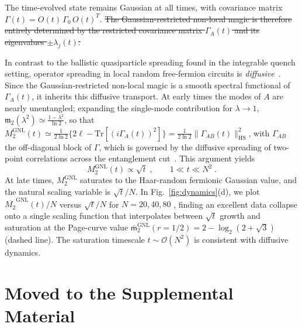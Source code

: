 \documentclass[aps,prl,twocolumn,superscriptaddress,reprint,longbibliography,nofootinbib]{revtex4-2}
\renewcommand{\log}{\operatorname{log}}\renewcommand{\det}{\operatorname{det}}
\providecommand{\DIFaddtex}[1]{{\protect\color{blue}\uwave{#1}}} %
\providecommand{\DIFdeltex}[1]{{\protect\color{red}\sout{#1}}}                      %
\providecommand{\DIFaddbegin}{} %
\providecommand{\DIFaddend}{} %
\providecommand{\DIFdelbegin}{} %
\providecommand{\DIFdelend}{} %
\providecommand{\DIFadd}[1]{\texorpdfstring{\DIFaddtex{#1}}{#1}} %
\providecommand{\DIFdel}[1]{\texorpdfstring{\DIFdeltex{#1}}{}} %
\newcommand{\DIFscaledelfig}{0.5}
\newlength{\DIFdelgraphicswidth} %
\newlength{\DIFdelgraphicsheight} %
\newcommand{\DIFaddincludegraphics}[2][]{{\color{blue}\fbox{\DIFOincludegraphics[#1]{#2}}}} %
\newcommand{\DIFdelincludegraphics}[2][]{%
\sbox{\DIFdelgraphicsbox}{\DIFOincludegraphics[#1]{#2}}%
\settoboxwidth{\DIFdelgraphicswidth}{\DIFdelgraphicsbox} %
\settoboxtotalheight{\DIFdelgraphicsheight}{\DIFdelgraphicsbox} %
\scalebox{\DIFscaledelfig}{%
\parbox[b]{\DIFdelgraphicswidth}{\usebox{\DIFdelgraphicsbox}\\[-\baselineskip] \rule{\DIFdelgraphicswidth}{0em}}\llap{\resizebox{\DIFdelgraphicswidth}{\DIFdelgraphicsheight}{%
\setlength{\unitlength}{\DIFdelgraphicswidth}%
\begin{picture}(1,1)%
\thicklines\linethickness{2pt} %
{\color[rgb]{1,0,0}\put(0,0){\framebox(1,1){}}}%
{\color[rgb]{1,0,0}\put(0,0){\line( 1,1){1}}}%
{\color[rgb]{1,0,0}\put(0,1){\line(1,-1){1}}}%
\end{picture}%
}\hspace*{3pt}}} %
} %
\DeclareRobustCommand{\DIFaddbegin}{\DIFOaddbegin \let\includegraphics\DIFaddincludegraphics} %
\DeclareRobustCommand{\DIFaddend}{\DIFOaddend \let\includegraphics\DIFOincludegraphics} %
\DeclareRobustCommand{\DIFdelbegin}{\DIFOdelbegin \let\includegraphics\DIFdelincludegraphics} %
\DeclareRobustCommand{\DIFdelend}{\DIFOaddend \let\includegraphics\DIFOincludegraphics} %
\begin{document}
\DIFdelend The time-evolved state remains Gaussian at all times, with covariance matrix $\Gamma(t) = O(t)\,\Gamma_0\,O(t)^T$.
\DIFdelbegin \DIFdel{The Gaussian-restricted non-local magic is therefore entirely determined by the restricted covariance matrix $\Gamma_A(t)$ and its eigenvalues $\pm\lambda_j(t)$.
}%

\DIFdelend In contrast to the ballistic quasiparticle spreading found in the integrable quench setting, operator spreading in local random free-fermion circuits is \emph{diffusive}~\cite{dias2021diffusiveoperatorspreadingrandom,swann}.
Since the Gaussian-restricted non-local magic is a smooth spectral functional of $\Gamma_A(t)$, it inherits this diffusive transport.
At early times the modes of $A$ are nearly unentangled; expanding the single-mode contribution for $\lambda\to1$, $\mathfrak{m}_2(\lambda^2) \simeq \frac{1-\lambda^2}{\ln 2}$, so that $M_2^{\mathrm{GNL}}(t) \simeq \frac{1}{2\ln 2}\{2\ell-\mathrm{Tr}[(i\Gamma_A(t))^2]\}=\frac{1}{2\ln 2}\|\Gamma_{AB}(t)\|_{\mathrm{HS}}^2$, with $\Gamma_{AB}$ the off-diagonal block of $\Gamma$, which is governed by the diffusive spreading of two-point correlations across the entanglement cut~\cite{dias2021diffusiveoperatorspreadingrandom}.
This argument yields
\begin{equation}
    M_2^{\mathrm{GNL}}(t) \propto \sqrt{t}\;, \qquad 1 \ll t \ll N^2\;.
\end{equation}
At late times, $M_2^{\mathrm{GNL}}$ saturates to the Haar-random fermionic Gaussian value, and the natural scaling variable is $\sqrt{t}/N$.
In Fig.~\ref{fig:dynamics}(d), we plot $\overline{M_2}^{\mathrm{GNL}}(t)/N$ versus $\sqrt{t}/N$ for $N = 20, 40, 80$ \DIFaddbegin \DIFadd{and the half-chain bipartition}\DIFaddend , finding an excellent data collapse onto a single scaling function that interpolates between $\sqrt{t}$ growth and saturation at the Page-curve value $\overline{\mathsf{m}}_{2}^{\mathrm{GNL}}(r=1/2)=2-\log_2(2+\sqrt{3})$  (dashed line).
The saturation timescale $t\sim\mathcal{O}(N^2)$ is consistent with diffusive dynamics.
\DIFaddbegin 

\DIFaddend \clearpage
\section*{Moved to the Supplemental Material}
\end{document}
